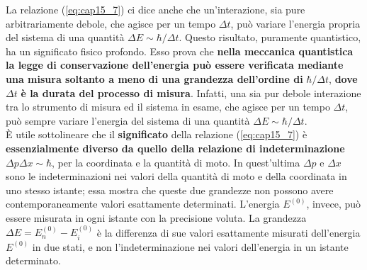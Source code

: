 La relazione (\ref{eq:cap15_7}) ci dice anche che un'interazione, sia pure arbitrariamente debole, che agisce per un tempo $\Delta t$, può variare l'energia propria del sistema di una quantità $\Delta E \sim \hbar /\Delta t$. Questo risultato, puramente quantistico, ha un significato fisico profondo. Esso prova che \textbf{nella meccanica quantistica la legge di conservazione dell'energia può essere verificata mediante una misura soltanto a meno di una grandezza dell'ordine di} $\hbar /\Delta t$, \textbf{dove } $\Delta t$ \textbf{è la durata del processo di misura}. Infatti, una sia pur debole interazione tra lo strumento di misura ed il sistema in esame, che agisce per un tempo $\Delta t $, può sempre variare l'energia del sistema di una quantità $\Delta E \sim \hbar /\Delta t$.\\

È utile sottolineare che il \textbf{significato} della relazione (\ref{eq:cap15_7}) è \textbf{essenzialmente diverso da quello della relazione di indeterminazione} $\Delta p \Delta x\sim \hbar$, per la coordinata e la quantità di moto. In quest'ultima $\Delta p$ e $\Delta x$ sono le indeterminazioni nei valori della quantità di moto e della coordinata in uno stesso istante;  essa mostra che queste due grandezze non possono avere contemporaneamente valori esattamente determinati. L'energia $E ^{(0)}$, invece, può essere misurata in ogni istante con la precisione voluta. La grandezza $\Delta E = E_n ^{(0)} - E_i ^{(0)}$ è la differenza di sue valori esattamente misurati dell'energia $E^{(0)}$ in due stati, e non l'indeterminazione nei valori dell'energia in un istante determinato.\\

